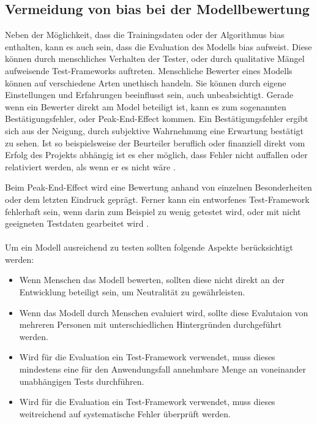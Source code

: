 \documentclass[hidelinks,12pt]{report}
\begin{document}
\subsection{Vermeidung von \Gls{bias}  bei der Modellbewertung}
Neben der Möglichkeit, dass die Trainingsdaten oder der Algorithmus \Gls{bias}  enthalten, kann es auch sein, dass die Evaluation des Modells \Gls{bias}  aufweist.
Diese können durch menschliches Verhalten der Tester, oder durch qualitative Mängel aufweisende Test-Frameworks auftreten. Menschliche Bewerter eines Modells können auf verschiedene Arten unethisch handeln. Sie können durch eigene Einstellungen und Erfahrungen beeinflusst sein, auch unbeabsichtigt. Gerade wenn ein Bewerter direkt am Model beteiligt ist, kann es zum sogenannten Bestätigungsfehler, oder \glqq Peak-End-Effect\grqq{} kommen. Ein Bestätigungsfehler ergibt sich aus der Neigung, durch subjektive Wahrnehmung eine Erwartung bestätigt zu sehen. Ist so beispielsweise der Beurteiler beruflich oder finanziell direkt vom Erfolg des Projekts abhängig ist es eher möglich, dass Fehler nicht auffallen oder relativiert werden, als wenn er es nicht wäre \cite[S. 54f.]{Srinivasan}.

\newpage

Beim \glqq Peak-End-Effect\grqq{} wird eine Bewertung anhand von einzelnen Besonderheiten oder dem letzten Eindruck geprägt. Ferner kann ein entworfenes Test-Framework fehlerhaft sein, wenn darin zum Beispiel zu wenig getestet wird, oder mit nicht geeigneten Testdaten gearbeitet wird \cite[S. 54f.]{Srinivasan}.
\\\\
Um ein Modell ausreichend zu testen sollten folgende Aspekte berücksichtigt werden:%
\\
\begin{itemize}
	\item Wenn Menschen das Modell bewerten, sollten diese nicht direkt an der Entwicklung beteiligt sein, um Neutralität zu gewährleisten.
	\item Wenn das Modell durch Menschen evaluiert wird, sollte diese Evalutaion von mehreren Personen mit unterschiedlichen Hintergründen durchgeführt werden.
	\item Wird für die Evaluation ein Test-Framework verwendet, muss dieses mindestens eine für den Anwendungsfall annehmbare Menge an voneinander unabhängigen Tests durchführen.
	\item Wird für die Evaluation ein Test-Framework verwendet, muss dieses weitreichend auf systematische Fehler überprüft werden.
\end{itemize}
\end{document}
